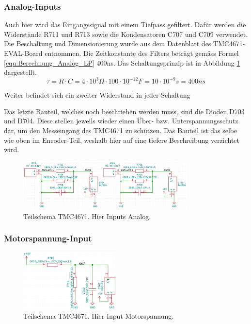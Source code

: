 \subsubsection{Analog-Inputs}\label{subsubsec:Analog_Inputs}

Auch hier wird das Eingangssignal mit einem Tiefpass gefiltert. Dafür werden die Widerstände R711 und R713 sowie die Kondensatoren C707 und C709 verwendet. Die Beschaltung und Dimensionierung wurde aus dem Datenblatt des TMC4671-EVAL-Board entnommen. Die Zeitkonstante des Filters beträgt gemäss Formel \ref{equ:Berechnung_Analog_LP} 400ns. Das Schaltungsprinzip ist in Abbildung \ref{fig:Schema_Analog_LP} dargestellt. \cite[PDF S.25]{trinamic_drawings_2018}
\begin{equation}
\tau = R \cdot C = 4\cdot 10^{3}\Omega \cdot 100\cdot10^{-12}F = 10 \cdot 10^{-9}s = 400ns
\label{equ:Berechnung_Analog_LP}
\end{equation}

Weiter befindet sich ein zweiter Widerstand in jeder Schaltung

Das letzte Bauteil, welches noch beschrieben werden muss, sind die Dioden D703 und D704. Diese stellen jeweils wieder einen Über- bzw. Unterspannungsschutz dar, um den Messeingang des TMC4671 zu schützen. Das Bauteil ist das selbe wie oben im Encoder-Teil, weshalb hier auf eine tiefere Beschreibung verzichtet wird.

\begin{figure}[h!]
	\centering	\includegraphics[width=0.8\textwidth]{graphics/Schema_Analog_Inputs_LP.png}
	\caption{Teilschema TMC4671. Hier Inputs Analog.}
	\label{fig:Schema_Analog_LP}
\end{figure}

\newpage

\subsubsection{Motorspannung-Input}\label{subsubsec:Motorspannung_Input}

\cite[PDF S.25]{trinamic_drawings_2018}
\begin{figure}[h!]
	\centering	\includegraphics[width=0.45\textwidth]{graphics/Schema_VM_Input_LP.png}
	\caption{Teilschema TMC4671. Hier Input Motorspannung.}
	\label{fig:Schema_Encoder_LP}
\end{figure}

